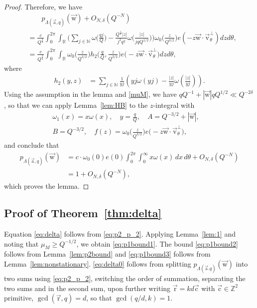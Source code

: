 \documentclass[letterpaper,11pt]{amsart}
\numberwithin{equation}{section}
\theoremstyle{definition}
\numberwithin{equation}{section}
\newcommand{\RR}{\mathbb{R}}
\newcommand{\ua}{\vec{\mathrm{a}}}
\newcommand{\ur}{\vec{\mathrm{r}}}
\newcommand{\uw}{{\vec{\mathrm{w}}}}
\newcommand{\uv}{{\vec{\mathrm{v}}}}
\newcommand{\uc}{{\vec{\mathrm{c}}}}
\newcommand{\N}{\mathbb{N}}
\begin{document}
\begin{proof}
 Therefore, we have 
	\begin{align*}
		&\quad \quad p_{\Lambda(\ua, q)}(\uw)+O_{N, \delta}(Q^{-N})\\&=\frac{c}{Q^{\frac{3}{2}}}
		\int_{0}^{2\pi}\int_{\RR}\Big(\sum_{j\in\N} \omega\big(\frac{qj}{Q}\big)-\frac{Q^{\frac{1}{2}}|z|}{j^2q^2} \omega\big(\frac{|z|}{jqQ^{1/2}}\big)\Big)
		\omega_0\big(\frac{z}{Q^{3/2}}\big)
		e(-z\uw\cdot \uv_{\theta}^\perp)
		dzd\theta,	
	\\	&=
		\frac{c}{Q^{\frac{3}{2}}}
		\int_{0}^{2\pi}\int_{\RR} 
	\omega_0\big(\frac{z}{Q^{3/2}}\big) 
		h_2\big(
		\frac{q}{Q}
		,
		\frac{z}{Q^{3/2}}
		\big)
		e\big(-z\uw\cdot \uv_{\theta}^\perp\big)
		dzd\theta,
	\end{align*}
	where
	\begin{align*}
		h_2(y,z)
		&=
		\sum_{j\in\N}
		\frac{1}{yj}
		\left(
		{yj}
		\omega\left(yj\right)
		-
		\frac{|z|}{yj}
		\omega\left(\frac{|z|}{yj}\right)
		\right).
	\end{align*}
	Using the assumption in the lemma and \eqref{muM},  we have 
	\(qQ^{-1}+|\uw|qQ^{1/2} \ll Q^{-2\delta}\), so that we can apply Lemma~\ref{lem:HB} to the $z$-integral with
	\begin{align*}
		\omega_1(x)={x\omega(x)},\quad
		y=\frac{q}{Q},\quad
		A=Q^{-3/2}+|\uw|,\quad
		\\B=Q^{-3/2},\quad
		f(z)=\omega_0\Big(\frac{z}{Q^{3/2}}\Big)e\Big(-z\uw\cdot \uv_{\theta}^\perp\Big),
	\end{align*}
	and conclude that
	\begin{equation*}\begin{split}%
		p_{\Lambda(\ua, q)}(\uw)
		&=c \cdot \omega_0(0)e(0)
		\int_{0}^{2\pi} 
		\int_0^\infty x
		\omega(x)\,dx
		\,d\theta+O_{N,\delta}(Q^{-N})
		\\&=1+O_{N,\delta}(Q^{-N}),
        \end{split}
	\end{equation*}
 which proves the lemma.
\end{proof}

\subsection{Proof of Theorem~\ref{thm:delta}}\label{sec:proof-delta}
 Equation \eqref{eq:delta} follows from \eqref{eq:p2_p_2}. Applying Lemma~\ref{lem:1} and noting that $\mu_M\geq Q^{-1/2}$, we obtain \eqref{eq:p1bound1}. The bound
\eqref{eq:p1bound2} follows from Lemma~\ref{lem:p2bound} and \eqref{eq:p1bound3} follows from Lemma~\ref{lem:nonstationary}. \eqref{eq:delta0} follows from splitting $p_{\Lambda(\ua.q)}(\uw)$ into two sums using \eqref{eq:p2_p_2}, switching the order of summation, separating the two sums and in the second sum, upon further writing $\ur=kd\uc$ with $\uc\in \mathbb Z^2$ primitive, $\gcd(\ur, q)=d$, so that $\gcd(q/d, k)=1$.
\end{document}
